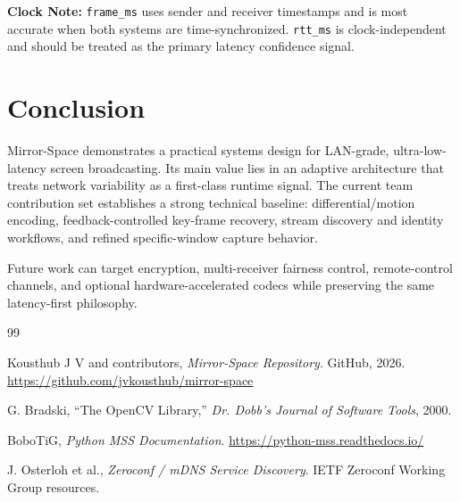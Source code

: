 \documentclass[12pt,a4paper]{article}
\begin{document}
\textbf{Clock Note:} \texttt{frame\_ms} uses sender and receiver timestamps and is most accurate when both systems are time-synchronized. \texttt{rtt\_ms} is clock-independent and should be treated as the primary latency confidence signal.

\newpage

\section{Conclusion}

Mirror-Space demonstrates a practical systems design for LAN-grade, ultra-low-latency screen broadcasting. Its main value lies in an adaptive architecture that treats network variability as a first-class runtime signal. The current team contribution set establishes a strong technical baseline: differential/motion encoding, feedback-controlled key-frame recovery, stream discovery and identity workflows, and refined specific-window capture behavior.

Future work can target encryption, multi-receiver fairness control, remote-control channels, and optional hardware-accelerated codecs while preserving the same latency-first philosophy.

\newpage


\begin{thebibliography}{99}

Kousthub J V and contributors,
\textit{Mirror-Space Repository}.
GitHub, 2026.
\url{https://github.com/jvkousthub/mirror-space}

G. Bradski,
``The OpenCV Library,''
\textit{Dr. Dobb's Journal of Software Tools}, 2000.

BoboTiG,
\textit{Python MSS Documentation}.
\url{https://python-mss.readthedocs.io/}

J. Osterloh et al.,
\textit{Zeroconf / mDNS Service Discovery}.
IETF Zeroconf Working Group resources.

\end{thebibliography}
\end{document}
